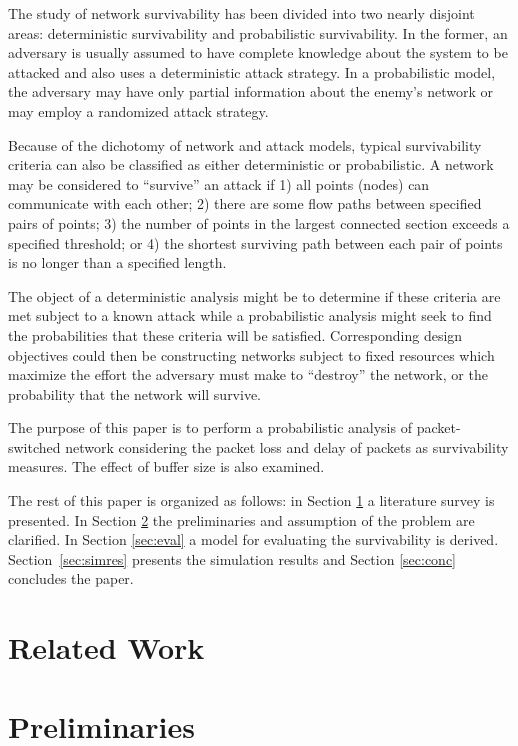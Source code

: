 \documentclass[conference]{IEEEtran}
\begin{document}
    The study of network survivability has been divided into two nearly disjoint areas: deterministic survivability and probabilistic survivability. In the former, an adversary is usually assumed to have complete knowledge about the system to be attacked and also uses a deterministic attack strategy. In a probabilistic model, the adversary may have only partial information about the enemy's network or may employ a randomized attack strategy.

    Because of the dichotomy of network and attack models, typical survivability criteria can also be classified as either deterministic or probabilistic. A network may be considered to ``survive'' an attack if 1) all points (nodes) can communicate with each other; 2) there are some flow paths between specified pairs of points; 3) the number of points in the largest connected section exceeds a specified threshold; or 4) the shortest surviving path between each pair of points is no longer than a specified length.

    The object of a deterministic analysis might be to determine if these criteria are met subject to a known attack while a probabilistic analysis might seek to find the probabilities that these criteria will be satisfied. Corresponding design objectives could then be constructing networks subject to fixed resources which maximize the effort the adversary must make to ``destroy'' the network, or the probability that the network will survive.

    The purpose of this paper is to perform a probabilistic analysis of packet-switched network considering the packet loss and delay of packets as survivability measures. The effect of buffer size is also examined.

    The rest of this paper is organized as follows: in Section \ref{sec:rlwork} a literature survey is presented. In Section \ref{sec:prel} the preliminaries and assumption of the problem are clarified. In Section \ref{sec:eval} a model for evaluating the survivability is derived. Section~\ref{sec:simres} presents the simulation results and Section \ref{sec:conc} concludes the paper.

    \section{Related Work} \label{sec:rlwork}

    \section{Preliminaries} \label{sec:prel}
\end{document}
